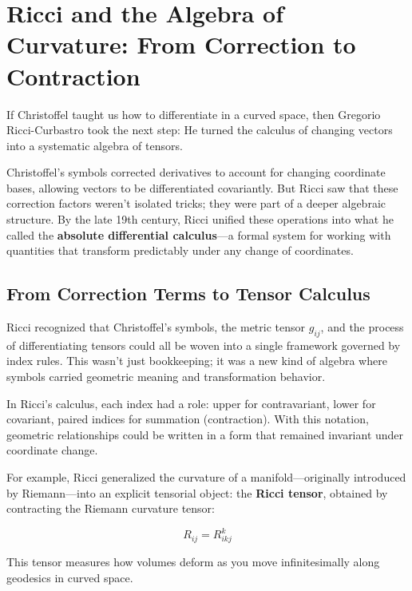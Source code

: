 \section{Ricci and the Algebra of Curvature: From Correction to Contraction}

If Christoffel taught us how to differentiate in a curved space, then Gregorio Ricci-Curbastro took the next step:  
He turned the calculus of changing vectors into a systematic algebra of tensors.

\bigskip

Christoffel’s symbols corrected derivatives to account for changing coordinate bases, allowing vectors to be differentiated covariantly.  
But Ricci saw that these correction factors weren’t isolated tricks; they were part of a deeper algebraic structure.  
By the late 19th century, Ricci unified these operations into what he called the \textbf{absolute differential calculus}—a formal system for working with quantities that transform predictably under any change of coordinates.

\bigskip

\subsection*{From Correction Terms to Tensor Calculus}

Ricci recognized that Christoffel’s symbols, the metric tensor \( g_{ij} \), and the process of differentiating tensors could all be woven into a single framework governed by index rules.  
This wasn’t just bookkeeping; it was a new kind of algebra where symbols carried geometric meaning and transformation behavior.

In Ricci’s calculus, each index had a role:  
upper for contravariant, lower for covariant, paired indices for summation (contraction).  
With this notation, geometric relationships could be written in a form that remained invariant under coordinate change.

\bigskip

For example, Ricci generalized the curvature of a manifold—originally introduced by Riemann—into an explicit tensorial object: the \textbf{Ricci tensor}, obtained by contracting the Riemann curvature tensor:

\[
R_{ij} = R^k_{ikj}
\]

This tensor measures how volumes deform as you move infinitesimally along geodesics in curved space.

\bigskip

